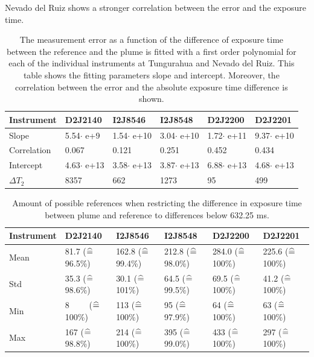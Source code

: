 Nevado del Ruiz shows a stronger correlation between the   error and the exposure time.\\
\begin{table}[h]
	\centering
	\begin{tabular}{|p{2cm}|p{2cm}|p{2cm}|p{2cm}|p{2cm}|p{2cm}|}
		Instrument	&D2J2140&I2J8546& I2J8548&D2J2200&D2J2201\\
		\toprule
		Slope& 5.54$\cdot$ e+9&1.54$\cdot$ e+10 &3.04$\cdot$ e+10&1.72$\cdot$ e+11&9.37$\cdot$ e+10\\
		\midrule
		Correlation&0.067
		&0.121&
		0.251&
		0.452&
		0.434\\
		\midrule
		Intercept&4.63$\cdot$ e+13&3.58$\cdot$ e+13& 3.87$\cdot$ e+13& 6.88$\cdot$ e+13& 4.68$\cdot$ e+13\\
		\midrule
		$\Delta T_{2}$&8357&662&1273&95&499\\
		\bottomrule
	\end{tabular}
	\caption{The  measurement error as a function of the difference of exposure time between the reference and the plume is fitted with a first order polynomial for each of the individual instruments at Tungurahua and Nevado del Ruiz. This table shows the fitting parameters slope and intercept. Moreover, the correlation between the  error and the absolute exposure time difference is shown.}
	\label{tab:exptimecalc}
\end{table}
%
\begin{table}
	\centering
	\begin{tabular}{|p{1.8cm}|p{2.15cm}|p{2.15cm}|p{2.15cm}|p{2.15cm}|p{2.15cm}|}
		Instrument	&D2J2140&I2J8546& I2J8548&D2J2200&D2J2201\\
		\toprule
		Mean&
		81.7 ($\mathrel{\widehat{=}}\,$96.5\%)		&162.8 ($\mathrel{\widehat{=}}\,$99.4\%)		&212.8 ($\mathrel{\widehat{=}}\,$98.0\%)		&284.0 ($\mathrel{\widehat{=}}\,$100\%)		&225.6 ($\mathrel{\widehat{=}}\,$100\%) \\
		\midrule
		Std&
		35.3 ($\mathrel{\widehat{=}}\,$98.6\%)&		30.1 ($\mathrel{\widehat{=}}\,$101\%)&
		64.5 ($\mathrel{\widehat{=}}\,$99.5\%) &		69.5 ($\mathrel{\widehat{=}}\,$100\%) &
		41.2 ($\mathrel{\widehat{=}}\,$100\%) \\
		\midrule
		Min  &
		8 $\qquad$($\mathrel{\widehat{=}}\,$100\%)&113 ($\mathrel{\widehat{=}}\,$100\%)
		&95 ($\mathrel{\widehat{=}}\,$97.9\%)
		&64 ($\mathrel{\widehat{=}}\,$100\%)
		&63 ($\mathrel{\widehat{=}}\,$100\%)\\
		\midrule
		Max&
		167 ($\mathrel{\widehat{=}}\,$98.8\%) &
		214 ($\mathrel{\widehat{=}}\,$100\%) &
		395 ($\mathrel{\widehat{=}}\,$99.0\%) &
		433 ($\mathrel{\widehat{=}}\,$100\%)  &
		297 ($\mathrel{\widehat{=}}\,$100\%) \\
		\bottomrule
	\end{tabular}
	\caption{Amount of possible references when restricting the difference in exposure time  between plume and reference to differences below 632.25 ms.}
	\label{tab:etrest}
\end{table}	

